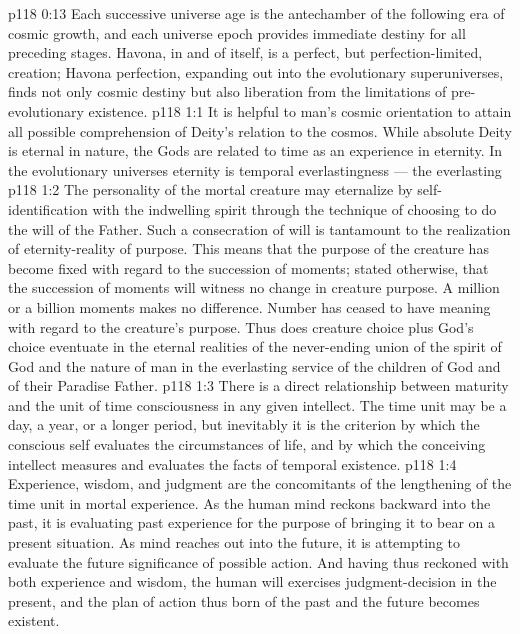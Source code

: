\vs p118 0:13 Each successive universe age is the antechamber of the following era of cosmic growth, and each universe epoch provides immediate destiny for all preceding stages. Havona, in and of itself, is a perfect, but perfection\hyp{}limited, creation; Havona perfection, expanding out into the evolutionary superuniverses, finds not only cosmic destiny but also liberation from the limitations of pre\hyp{}evolutionary existence.
\vs p118 1:1 It is helpful to man’s cosmic orientation to attain all possible comprehension of Deity’s relation to the cosmos. While absolute Deity is eternal in nature, the Gods are related to time as an experience in eternity. In the evolutionary universes eternity is temporal everlastingness --- the everlasting 
\vs p118 1:2 \pc The personality of the mortal creature may eternalize by self\hyp{}identification with the indwelling spirit through the technique of choosing to do the will of the Father. Such a consecration of will is tantamount to the realization of eternity\hyp{}reality of purpose. This means that the purpose of the creature has become fixed with regard to the succession of moments; stated otherwise, that the succession of moments will witness no change in creature purpose. A million or a billion moments makes no difference. Number has ceased to have meaning with regard to the creature’s purpose. Thus does creature choice plus God’s choice eventuate in the eternal realities of the never\hyp{}ending union of the spirit of God and the nature of man in the everlasting service of the children of God and of their Paradise Father.
\vs p118 1:3 There is a direct relationship between maturity and the unit of time consciousness in any given intellect. The time unit may be a day, a year, or a longer period, but inevitably it is the criterion by which the conscious self evaluates the circumstances of life, and by which the conceiving intellect measures and evaluates the facts of temporal existence.
\vs p118 1:4 Experience, wisdom, and judgment are the concomitants of the lengthening of the time unit in mortal experience. As the human mind reckons backward into the past, it is evaluating past experience for the purpose of bringing it to bear on a present situation. As mind reaches out into the future, it is attempting to evaluate the future significance of possible action. And having thus reckoned with both experience and wisdom, the human will exercises judgment\hyp{}decision in the present, and the plan of action thus born of the past and the future becomes existent.
